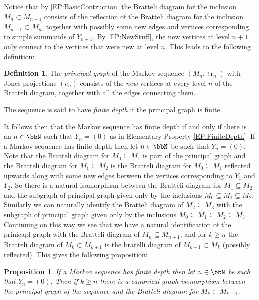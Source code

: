 \documentclass[11pt]{article}
\theoremstyle{plain}
\newtheorem{prop}[thm]{Proposition}
\theoremstyle{definition}
\newtheorem{defn}[thm]{Definition}
\DeclareMathOperator{\tr}{tr}
\begin{document}
Notice that by \ref{EP:BasicContruction} the Bratteli diagram for the inclusion $M_{n}\subset M_{n+1}$ consists of the reflection of the Bratteli diagram for the inclusion $M_{n-1} \subset M_n$, together with possibly some new edges and vertices corresponding to simple summands of $Y_{n+1}$. By \ref{EP:NewStuff}, the new vertices at level $n+1$ only connect to the vertices that were new at level $n$. This leads to the following definition:


\begin{defn}
The \emph{principal graph} of the Markov sequence $(M_n,\tr_n)$ with Jones projections $(e_n)$ consists of the \emph{new} vertices at every level $n$ of the Bratteli diagram, together with all the edges connecting them.

The sequence is said to have \emph{finite depth} if the principal graph is finite.
\end{defn}


It follows then that the Markov sequence has finite depth if and only if there is an $n\in \bbN$ such that $Y_n = (0)$ as in Elementary Property \eqref{EP:FiniteDepth}. If a Markov sequence has finite depth then let $n\in \bbN$ be such that $Y_n=(0)$. Note that the Bratteli diagram for $M_0\subseteq M_1$ is part of the principal graph and the Bratteli diagram for $M_1\subseteq M_2$ is the Bratteli diagram for $M_0\subseteq M_1$ reflected upwards along with some new edges between the vertices corresponding to $Y_1$ and $Y_2$. So there is a natural isomorphism between the Bratteli diagram for $M_1\subseteq M_2$ and the subgraph of principal graph given only by the inclusions $M_0\subseteq M_1\subseteq M_2$. Similarly we can naturally identify the Bratteli diagram of $M_2\subseteq M_3$ with the subgraph of principal graph given only by the inclusions $M_0\subseteq M_1\subseteq M_2\subseteq M_3$. Continuing on this way we see that we have a natural identification of the prinicapl graph with the Bratteli diagram of $M_n\subseteq M_{n+1}$, and for $k\geq n$ the Bratteli diagram of $M_{k}\subset M_{k+1}$ is the bratelli diagram of $M_{k-1}\subset M_{k}$ (possibly reflected). This gives the following proposition:

\begin{prop}\label{BratteliPrincipal}
If a Markov sequence has finite depth then let $n\in \bbN$ be such that $Y_n=(0)$. Then if $k\geq n$ there is a canonical graph isomorphism between the principal graph of the sequence and the Bratteli diagram for $M_{k}\subset M_{k+1}$.
\end{prop}
\end{document}

